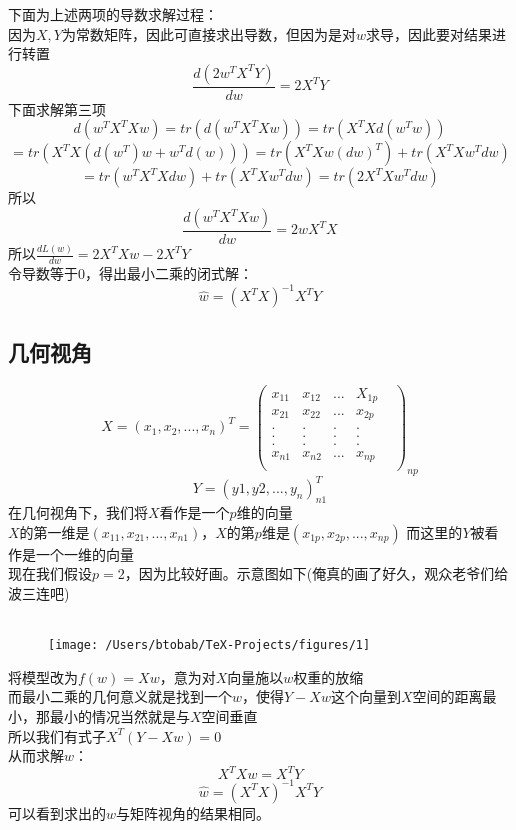 \documentclass{report}
\begin{document}
下面为上述两项的导数求解过程：\\
因为$X,Y$为常数矩阵，因此可直接求出导数，但因为是对$w$求导，因此要对结果进行转置
$$
\frac{d(2w^TX^TY)}{dw}=2X^TY
$$
下面求解第三项
$$
d(w^TX^TXw)=tr(d(w^TX^TXw))=tr(X^TXd(w^Tw))
$$
$$
=tr(X^TX(d(w^T)w+w^Td(w)))=tr(X^TXw(dw)^T)+tr(X^TXw^Tdw)
$$
$$
=tr(w^TX^TXdw)+tr(X^TXw^Tdw)=tr(2X^TXw^Tdw)
$$
所以
$$
\frac{d(w^TX^TXw)}{dw}=2wX^TX
$$
所以$\frac{dL(w)}{dw}=2X^TXw-2X^TY$\\
令导数等于0，得出最小二乘的闭式解：
$$
\hat{w}=(X^TX)^{-1}X^TY
$$
\subsection{几何视角}
$$
X=(x_1,x_2,...,x_n)^T=\begin{pmatrix}
x_{11}&x_{12}&...&X_{1p}\\
x_{21}&x_{22}&...&x_{2p}\\
.&.&.&.&\\
.&.&.&.&\\
.&.&.&.&\\
x_{n1}&x_{n2}&...&x_{np}\\
\end{pmatrix}_{np}
$$
$$
Y=(y1,y2,...,y_n)_{n1}^T
$$
在几何视角下，我们将$X$看作是一个$p$维的向量\\
$X$的第一维是$(x_{11},x_{21},...,x_{n1})$，$X$的第$p$维是$(x_{1p},x_{2p},...,x_{np})$
而这里的$Y$被看作是一个一维的向量\\
现在我们假设$p=2$，因为比较好画。示意图如下(俺真的画了好久，观众老爷们给波三连吧)\\\\
\begin{figure}
\center
\texttt{[image: /Users/btobab/TeX-Projects/figures/1]}
\end{figure}
将模型改为$f(w)=Xw$，意为对$X$向量施以$w$权重的放缩\\
而最小二乘的几何意义就是找到一个$w$，使得$Y-Xw$这个向量到$X$空间的距离最小，那最小的情况当然就是与$X$空间垂直\\
所以我们有式子$X^T(Y-Xw)=0$\\
从而求解$w$：
$$
X^TXw=X^TY
$$
$$
\hat{w}=(X^TX)^{-1}X^TY
$$
可以看到求出的$w$与矩阵视角的结果相同。
\end{document}
